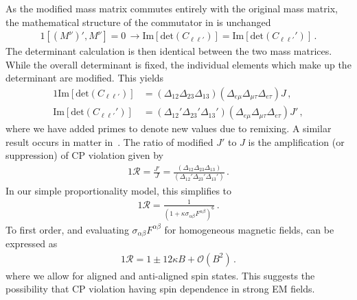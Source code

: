 As the modified mass matrix commutes entirely with the original mass matrix, the mathematical structure of the commutator in  is unchanged
\begin{alignat}{1}
	\label{commutes:1} \left[(M^{\nu})',M^{\nu}\right]=0\,\rightarrow
    \mathrm{Im}[\mathrm{det}(C_{\ell\ell'})] = \mathrm{Im}[\mathrm{det}(C_{\ell\ell'}')]\,.
\end{alignat}
The determinant calculation is then identical between the two mass matrices. While the overall determinant is fixed, the individual elements which make up the determinant are modified. This yields
\begin{alignat}{1}
	\label{det:0} \mathrm{Im}\left[\mathrm{det}(C_{\ell\ell'})\right] &= \left(\Delta_{12}\Delta_{23}\Delta_{13}\right)\left(\Delta_{e\mu}\Delta_{\mu\tau}\Delta_{e\tau}\right)J\,,\\
	\label{det:2} \mathrm{Im}\left[\mathrm{det}(C_{\ell\ell'}')\right] &= \left(\Delta_{12}'\Delta_{23}'\Delta_{13}'\right)\left(\Delta_{e\mu}\Delta_{\mu\tau}\Delta_{e\tau}\right)J'\,,
\end{alignat}
where we have added primes to denote new values due to remixing. A similar result occurs in matter in~\cite{Harrison:1999df}. The ratio of modified $J'$ to $J$ is the amplification (or suppression) of CP violation given by
\begin{alignat}{1}
	\label{ampj:1} \mathcal{R} = \frac{J'}{J} = \frac{\left(\Delta_{12}\Delta_{23}\Delta_{13}\right)}{\left(\Delta_{12}'\Delta_{23}'\Delta_{13}'\right)}\,.
\end{alignat}
In our simple proportionality model, this simplifies to
\begin{alignat}{1}
	\label{ampj:2} \mathcal{R} = \frac{1}{\left(1+\kappa\sigma_{\alpha\beta}F^{\alpha\beta}\right)^{6}}\,.
\end{alignat}
To first order, and evaluating $\sigma_{\alpha\beta}F^{\alpha\beta}$ for homogeneous magnetic fields,  can be expressed as
\begin{alignat}{1}
	\label{amp:3} \mathcal{R} = 1\pm12\kappa B+\mathcal{O}(B^{2})\,.
\end{alignat}
where we allow for aligned and anti-aligned spin states. This suggests the possibility that CP violation having spin dependence in strong EM fields.

